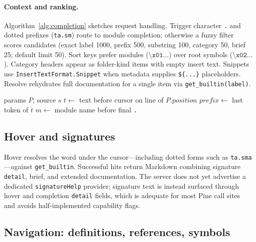 \documentclass[11pt,a4paper]{article}
\begin{document}
\paragraph{Context and ranking.}
Algorithm~\ref{alg:completion} sketches request handling. Trigger character \texttt{.}
and dotted prefixes (\texttt{ta.sm}) route to module completion; otherwise a fuzzy filter
scores candidates (exact label 1000, prefix 500, substring 100, category 50, brief 25;
default limit 50). Sort keys prefer modules (\(\texttt{\textbackslash x01}\ldots\)) over
root symbols (\(\texttt{\textbackslash x02}\ldots\)). Category headers appear as
folder-kind items with empty insert text. Snippets use \texttt{InsertTextFormat.Snippet}
when metadata supplies \texttt{\$\{...\}} placeholders. Resolve rehydrates full
documentation for a single item via \texttt{get\_builtin(label)}.

\begin{algorithm}[t]
\caption{HandleCompletion}
\label{alg:completion}
\begin{algorithmic}[1]
\Require params \(P\), source \(s\)
\State \(t \gets\) text before cursor on line of \(P.\mathit{position}\)
\State \(prefix \gets\) last token of \(t\)
  \State \(m \gets\) module name before final \texttt{.}
  \State \Return {}
\Else
  \State \Return {}
\EndIf
\end{algorithmic}
\end{algorithm}

\subsection{Hover and signatures}
\label{sec:feat-hover}

Hover resolves the word under the cursor---including dotted forms such as
\texttt{ta.sma}---against \texttt{get\_builtin}. Successful hits return Markdown
combining signature \texttt{detail}, brief, and extended documentation. The server does
not yet advertise a dedicated \texttt{signatureHelp} provider; signature text is instead
surfaced through hover and completion \texttt{detail} fields, which is adequate for
most Pine call sites and avoids half-implemented capability flags.

\subsection{Navigation: definitions, references, symbols}
\label{sec:feat-nav}
\end{document}
